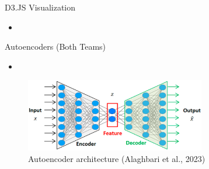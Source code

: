 \begin{frame}{D3.JS Visualization}
    \begin{itemize}
        \item 
    \end{itemize}
\end{frame}

\begin{frame}{Autoencoders (Both Teams)}
    \begin{itemize}
        \item 
    \end{itemize}
    \begin{figure}
        \centering
        \includegraphics[height=0.7\textheight,width=0.7\textwidth,keepaspectratio]{images/autoencoder.png}
        \caption{Autoencoder architecture (Alaghbari et al., 2023)}
    \end{figure}
\end{frame}